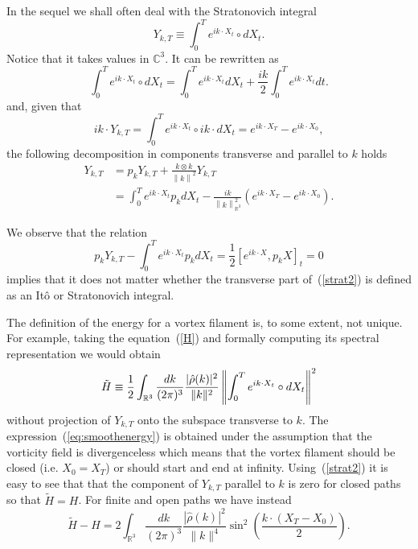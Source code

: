 In the sequel we shall often deal with the Stratonovich integral 
$$
Y_{k,T} \equiv \int_{0}^{T}e^{ik\cdot X_{t}}\circ dX_{t}.
$$ 
Notice that it takes values in $%
\mathbb{C}^{3}$. It can be rewritten as 
\begin{equation}
\int_{0}^{T}e^{ik\cdot X_{t}}\circ dX_{t}=\int_{0}^{T}e^{ik\cdot
X_{t}}dX_{t}+\frac{ik}{2}\int_{0}^{T}e^{ik\cdot X_{t}}dt.  \label{strat1}
\end{equation}
and, given that
$$
ik\cdot Y_{k,T} = \int_0^T  e^{ik\cdot X_t} \circ ik \cdot dX_t =
e^{i k\cdot X_T} - e^{i k\cdot X_0}, 
$$
the following decomposition in components transverse and parallel
to $k$  holds
\begin{equation}
\begin{split}
Y_{k,T} & = p_k Y_{k,T} + \frac{k\otimes k}{\left\| k\right\|^2} Y_{k,T}
\\ & 
=\int_{0}^{T}e^{ik\cdot
X_{t}}p_{k}dX_{t}-\frac{ik}{\left\| k\right\| _{\mathbb{R}^{3}}^{2}}\left(
e^{ik\cdot X_{T}}-e^{ik\cdot X_{0}}\right).   \label{strat2}
\end{split}
\end{equation}


We observe that the relation
$$
p_k Y_{k,T} -  \int_{0}^{T}e^{ik\cdot
X_{t}}p_{k}dX_{t} = \frac{1}{2} [e^{ik\cdot X}, p_k X]_t = 0
$$
implies that it does not matter whether the
transverse part of~(\ref{strat2}) is defined as an It\^o or
Stratonovich integral. 

The definition of the energy for a vortex filament is, to some extent, not
unique. For example, taking the equation~(\ref{H}) and formally
computing its spectral representation we would obtain 
\begin{equation}
\tilde{H} \equiv \frac{1}{2} \int_{\mathbb{R}^3} \frac{dk}{(2\pi)^3} \frac{|\hat{\rho}(k)|^2}{\|k\|^2} 
\left\| \int_0^T e^{i k \cdot X_t} \circ dX_t \right\|^2
\end{equation}
without projection of $Y_{k,T}$ onto the subspace transverse to $k$. 
The expression~(\ref{eq:smoothenergy}) is obtained under the assumption that the
vorticity field is divergenceless which means that the vortex filament
should be closed (i.e. $X_0 = X_T$) or should start and end at
infinity. Using~(\ref{strat2}) it is easy to see that that the
component of $Y_{k,T}$ parallel to $k$ is zero for closed paths so
that $\tilde{H} = H$. 
For finite and open paths we have instead
\begin{equation}
\tilde{H} - H = 2 \int_{\mathbb{R}^3}  \frac{dk}{(2\pi)^3} \frac{|\hat{\rho}(k)|^2}{\|k\|^4}
\sin^2\left(\frac{k \cdot (X_T-X_0)}{2}\right).
\label{eq:difference}
\end{equation}

